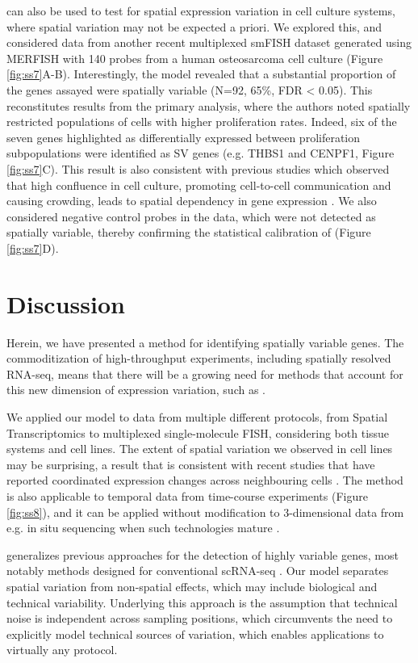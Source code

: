  can also be used to test for spatial expression variation in cell culture systems, where spatial variation may not be expected a priori. We explored this, and considered data from another recent multiplexed smFISH dataset generated using MERFISH with 140 probes from a human osteosarcoma cell culture \cite{Moffitt2016-bi} (Figure \ref{fig:ss7}A-B). Interestingly, the model revealed that a substantial proportion of the genes assayed were spatially variable (N=92, 65\%, FDR < 0.05). This reconstitutes results from the primary analysis, where the authors noted spatially restricted populations of cells with higher proliferation rates. Indeed, six of the seven genes highlighted as differentially expressed between proliferation subpopulations were identified as SV genes (e.g. THBS1 and CENPF1, Figure \ref{fig:ss7}C). This result is also consistent with previous studies which observed that high confluence in cell culture, promoting cell-to-cell communication and causing crowding, leads to spatial dependency in gene expression \cite{Battich2015-qu}. We also considered negative control probes in the data, which were not detected as spatially variable, thereby confirming the statistical calibration of  (Figure \ref{fig:ss7}D).

\section{Discussion}

Herein, we have presented a method for identifying spatially variable genes. The commoditization of high-throughput experiments, including spatially resolved RNA-seq, means that there will be a growing need for methods that account for this new dimension of expression variation, such as .

We applied our model to data from multiple different protocols, from Spatial Transcriptomics to multiplexed single-molecule FISH, considering both tissue systems and cell lines. The extent of spatial variation we observed in cell lines may be surprising, a result that is consistent with recent studies that have reported coordinated expression changes across neighbouring cells \cite{Battich2015-qu}. The method is also applicable to temporal data from time-course experiments (Figure \ref{fig:ss8}), and it can be applied without modification to 3-dimensional data from e.g. in situ sequencing when such technologies mature \cite{Lee2014-ix, Lee2015-sz}.

 generalizes previous approaches for the detection of highly variable genes, most notably methods designed for conventional scRNA-seq \cite{Brennecke2013-vv}. Our model separates spatial variation from non-spatial effects, which may include biological and technical variability. Underlying this approach is the assumption that technical noise is independent across sampling positions, which circumvents the need to explicitly model technical sources of variation, which enables applications to virtually any protocol.

